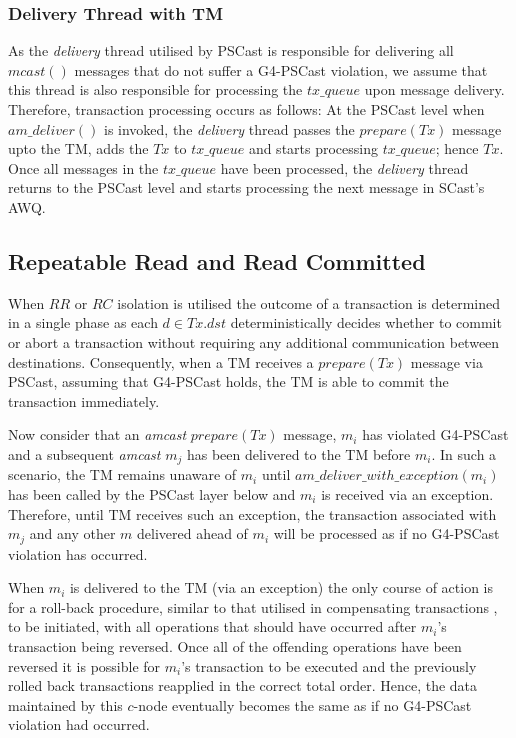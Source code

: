     \subsubsection*{Delivery Thread with TM}
    As the \emph{delivery} thread utilised by \textsf{PSCast} is responsible for delivering all $mcast()$ messages that do not suffer a G4-PSCast violation, we assume that this thread is also responsible for processing the $tx\_queue$ upon message delivery.  Therefore, transaction processing occurs as follows: At the \textsf{PSCast} level when $am\_deliver()$ is invoked, the \emph{delivery} thread passes the $prepare(Tx)$ message upto the TM, adds the $Tx$ to $tx\_queue$ and starts processing $tx\_queue$; hence $Tx$.  Once all messages in the $tx\_queue$ have been processed, the \emph{delivery} thread returns to the \textsf{PSCast} level and starts processing the next message in \textsf{SCast}'s AWQ.
       
    \subsection{Repeatable Read and Read Committed}
    When $RR$ or $RC$ isolation is utilised the outcome of a transaction is determined in a single phase as each $d \in Tx.dst$ deterministically decides whether to commit or abort a transaction without requiring any additional communication between destinations.  Consequently, when a TM receives a $prepare(Tx)$ message via \textsf{PSCast}, assuming that G4-PSCast holds, the TM is able to commit the transaction immediately.  
    
    Now consider that an \emph{amcast} $prepare(Tx)$ message, $m_i$ has violated G4-PSCast and a subsequent \emph{amcast} $m_j$ has been delivered to the TM before $m_i$.  In such a scenario, the TM remains unaware of $m_i$ until $am\_deliver\_with\_exception(m_i)$ has been called by the \textsf{PSCast} layer below and $m_i$ is received via an exception.  Therefore, until TM receives such an exception, the transaction associated with $m_j$ and any other $m$ delivered ahead of $m_i$ will be processed as if no G4-PSCast violation has occurred.  
    
    When $m_i$ is delivered to the TM (via an exception) the only course of action is for a roll-back procedure, similar to that utilised in compensating transactions \citep{Korth:1990:FAR:645916.671971}, to be initiated, with all operations that should have occurred after $m_i$'s transaction being reversed.  Once all of the offending operations have been reversed it is possible for $m_i$'s transaction to be executed and the previously rolled back transactions reapplied in the correct total order.  Hence, the data maintained by this $c$-node eventually becomes the same as if no G4-PSCast violation had occurred.  
    
